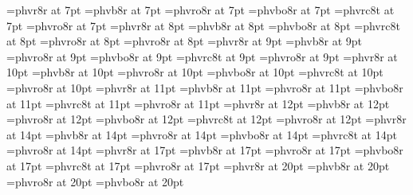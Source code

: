 %
%
%    
%    
%
%
%
%
%
\immediate{}
%
\font\sevenrm=phvr8r at 7pt
\font\sevenbf=phvb8r at 7pt
\font\sevenit=phvro8r at 7pt
\font\sevenbi=phvbo8r at 7pt
\font\sevensc=phvrc8t at 7pt
\font\sevensl=phvro8r at 7pt
%
\font\eightrm=phvr8r at 8pt
\font\eightbf=phvb8r at 8pt
\font\eightbi=phvbo8r at 8pt
\font\eightsc=phvrc8t at 8pt
\font\eightit=phvro8r at 8pt
\font\eightsl=phvro8r at 8pt
%
\font\ninerm=phvr8r at 9pt
\font\ninebf=phvb8r at 9pt
\font\nineit=phvro8r at 9pt
\font\ninebi=phvbo8r at 9pt
\font\ninesc=phvrc8t at 9pt
\font\ninesl=phvro8r at 9pt
%
\font\tenrm=phvr8r at 10pt
\font\tenbf=phvb8r at 10pt
\font\tenit=phvro8r at 10pt
\font\tenbi=phvbo8r at 10pt
\font\tensc=phvrc8t at 10pt
\font\tensl=phvro8r at 10pt
%
\font\elevenrm=phvr8r at 11pt
\font\elevenbf=phvb8r at 11pt
\font\elevenit=phvro8r at 11pt
\font\elevenbi=phvbo8r at 11pt
\font\elevensc=phvrc8t at 11pt
\font\elevensl=phvro8r at 11pt
%
\font\twelverm=phvr8r at 12pt
\font\twelvebf=phvb8r at 12pt
\font\twelveit=phvro8r at 12pt
\font\twelvebi=phvbo8r at 12pt
\font\twelvesc=phvrc8t at 12pt
\font\twelvesl=phvro8r at 12pt
%
\font\frtrm=phvr8r at 14pt
\font\frtbf=phvb8r at 14pt
\font\frtit=phvro8r at 14pt
\font\frtbi=phvbo8r at 14pt
\font\frtsc=phvrc8t at 14pt
\font\frtsl=phvro8r at 14pt
%
\font\svtrm=phvr8r at 17pt
\font\svtbf=phvb8r at 17pt
\font\svtit=phvro8r at 17pt
\font\svtbi=phvbo8r at 17pt
\font\svtsc=phvrc8t at 17pt
\font\svtsl=phvro8r at 17pt
%
\font\twtyrm=phvr8r at 20pt
\font\twtybf=phvb8r at 20pt
\font\twtyit=phvro8r at 20pt
\font\twtybi=phvbo8r at 20pt
